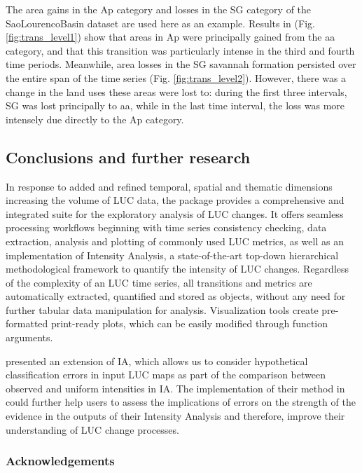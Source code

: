 The area gains in the Ap category and losses in the SG category of the
SaoLourencoBasin dataset are used here as an example. Results in (Fig.
\ref{fig:trans_level1}) show that areas in Ap were principally gained
from the aa category, and that this transition was particularly intense
in the third and fourth time periods. Meanwhile, area losses in the SG
savannah formation persisted over the entire span of the time series
(Fig. \ref{fig:trans_level2}). However, there was a change in the land
uses these areas were lost to: during the first three intervals, SG was
lost principally to aa, while in the last time interval, the loss was
more intensely due directly to the Ap category.

\hypertarget{conclusions-and-further-research}{%
\subsection{Conclusions and further
research}\label{conclusions-and-further-research}}

In response to added and refined temporal, spatial and thematic
dimensions increasing the volume of LUC data, the  package
provides a comprehensive and integrated suite for the exploratory
analysis of LUC changes. It offers seamless processing workflows
beginning with time series consistency checking, data extraction,
analysis and plotting of commonly used LUC metrics, as well as an
implementation of Intensity Analysis, a state-of-the-art top-down
hierarchical methodological framework to quantify the intensity of LUC
changes. Regardless of the complexity of an LUC time series, all
transitions and metrics are automatically extracted, quantified and
stored as objects, without any need for further tabular data
manipulation for analysis. Visualization tools create pre-formatted
print-ready plots, which can be easily modified through function
arguments.

\citet{Aldwaik2013} presented an extension of IA, which allows us to
consider hypothetical classification errors in input LUC maps as part of
the comparison between observed and uniform intensities in IA. The
implementation of their method in could further help users to
assess the implications of errors on the strength of the evidence in the
outputs of their Intensity Analysis and therefore, improve their
understanding of LUC change processes.

\hypertarget{acknowledgements}{%
\subsubsection{Acknowledgements}\label{acknowledgements}}

